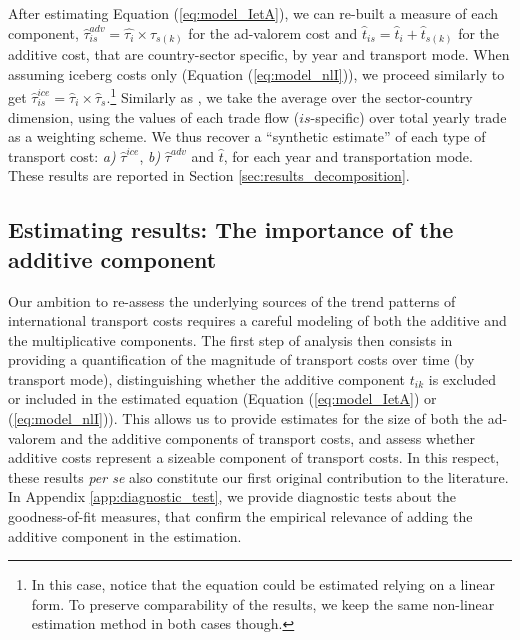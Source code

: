 \documentclass[a4paper,11pt]{article}
\begin{document}


After estimating Equation (\ref{eq:model_IetA}), we can re-built a measure of each component, $\widehat{\tau}^{adv}_{is} = \widehat{\tau_{i}} \times \widehat{\tau}_{s(k)}$ for the ad-valorem cost and $\widehat{t}_{is} = \widehat{t}_{i} + \widehat{t}_{s(k)}$ for the additive cost, that are country-sector specific, by year and transport mode. When assuming iceberg costs only (Equation (\ref{eq:model_nlI})), we proceed similarly to get $\widehat{\tau}^{ice}_{is} = \widehat{\tau}_{i} \times \widehat{\tau}_{s}$.\footnote{In this case, notice that the equation could be estimated relying on a linear form. To preserve comparability of the results, we keep the same non-linear estimation method in both cases though.} Similarly as \citet{Irrazabal_2015}, we take the average over the sector-country dimension, using the values of each trade flow ($is$-specific) over total yearly trade as a weighting scheme. We thus recover a ``synthetic estimate'' of each type of transport cost: \textit{a)} $\widehat{\tau}^{ice}$, \textit{b)} $\widehat{\tau}^{adv}$ and $\widehat{t}$, for each year and transportation mode. These results are reported in Section \ref{sec:results_decomposition}.


\subsection{Estimating results: The importance of the additive component \label{sec:results_decomposition}}

Our ambition to re-assess the underlying sources of the trend patterns of international transport costs requires a careful modeling of both the additive and the multiplicative components. The first step of analysis then consists in providing a quantification of the magnitude of transport costs over time (by transport mode), distinguishing whether the additive component $t_{ik}$ is excluded or included in the estimated equation (Equation (\ref{eq:model_IetA}) or (\ref{eq:model_nlI})). This allows us to provide estimates for the size of both the ad-valorem and the additive components of transport costs, and assess whether additive costs represent a sizeable component of transport costs. In this respect, these results \textit{per se} also constitute our first original contribution to the literature. In Appendix \ref{app:diagnostic_test}, we provide diagnostic tests about the goodness-of-fit measures, that confirm the empirical relevance of adding the additive component in the estimation.\smallskip
\end{document}
